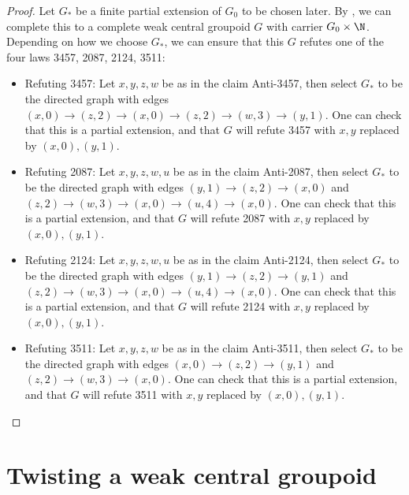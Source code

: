 \begin{proof}
  Let $G_*$ be a finite partial extension of $G_0$ to be chosen later. By , we can complete this to a complete weak central groupoid $G$ with carrier $G_0 \times \N$. Depending on how we choose $G_*$, we can ensure that this $G$ refutes one of the four laws 3457, 2087, 2124, 3511:
  \begin{itemize}
   \item Refuting 3457: Let $x,y,z,w$ be as in the claim Anti-3457, then select $G_*$ to be the directed graph with edges $(x,0) \to (z,2) \to (x,0) \to (z,2) \to (w,3) \to (y,1)$. One can check that this is a partial extension, and that $G$ will refute 3457 with $x,y$ replaced by $(x,0),(y,1)$.
   \item Refuting 2087: Let $x,y,z,w,u$ be as in the claim Anti-2087, then select $G_*$ to be the directed graph with edges $(y,1) \to (z,2) \to (x,0)$ and $(z,2) \to (w,3) \to (x,0) \to (u,4) \to (x,0)$. One can check that this is a partial extension, and that $G$ will refute 2087 with $x,y$ replaced by $(x,0),(y,1)$.
   \item Refuting 2124: Let $x,y,z,w,u$ be as in the claim Anti-2124, then select $G_*$ to be the directed graph with edges $(y,1) \to (z,2) \to (y,1)$ and $(z,2) \to (w,3) \to (x,0) \to (u,4) \to (x,0)$. One can check that this is a partial extension, and that $G$ will refute 2124 with $x,y$ replaced by $(x,0),(y,1)$.
   \item Refuting 3511: Let $x,y,z,w$ be as in the claim Anti-3511, then select $G_*$ to be the directed graph with edges $(x,0) \to (z,2) \to (y,1)$ and $(z,2) \to (w,3) \to (x,0)$. One can check that this is a partial extension, and that $G$ will refute 3511 with $x,y$ replaced by $(x,0),(y,1)$.
  \end{itemize}
\end{proof}


\section{Twisting a weak central groupoid}\label{twist-sec}

